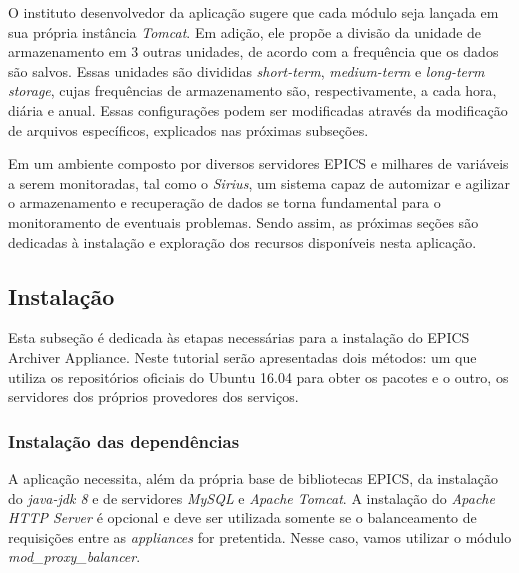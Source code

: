 \vspace{12pt}

O instituto desenvolvedor da aplicação sugere que cada módulo seja lançada em
sua própria instância \textit{Tomcat}. Em adição, ele propõe a divisão da
unidade de armazenamento em 3 outras unidades, de acordo com a frequência que os
dados são salvos. Essas unidades são divididas \textit{short-term},
\textit{medium-term} e \textit{long-term storage}, cujas frequências de
armazenamento são, respectivamente, a cada hora, diária e anual. Essas
configurações podem ser modificadas através da modificação de arquivos
específicos, explicados nas próximas subseções.

\vspace{12pt}


Em um ambiente composto por diversos servidores EPICS e milhares de variáveis a
serem monitoradas, tal como o \textit{Sirius}, um sistema capaz de automizar e
agilizar o armazenamento e recuperação de dados se torna fundamental para o
monitoramento de eventuais problemas. Sendo assim, as próximas seções são
dedicadas à instalação e exploração dos recursos disponíveis nesta aplicação.
\subsection {Instalação}

Esta subseção é dedicada às etapas necessárias para a instalação do EPICS
Archiver Appliance. Neste tutorial serão apresentadas dois métodos: um que
utiliza os repositórios oficiais do Ubuntu 16.04 para obter os pacotes e o
outro, os servidores dos próprios provedores dos serviços.

\subsubsection {Instalação das dependências}
\label{ref:epics-install}
A aplicação necessita, além da própria base de bibliotecas EPICS, da
instalação do \textit{java-jdk 8} e de servidores \textit{MySQL} e
\textit{Apache Tomcat}. A instalação do \textit{Apache HTTP Server} é opcional e
deve ser utilizada somente se o balanceamento de requisições entre as
\textit{appliances} for pretentida. Nesse caso, vamos utilizar o módulo
\textit{mod\_proxy\_balancer}.


